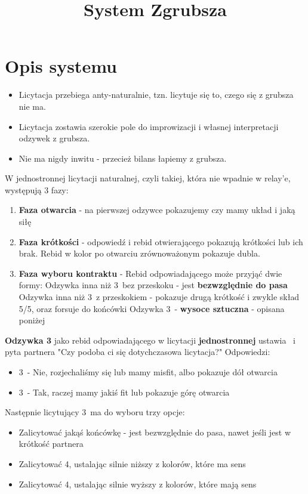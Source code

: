\documentclass[12pt, a4paper]{article}
\title{\vspace{-2cm}System Zgrubsza}
\author{}
\date{}
\begin{document}
\section{Opis systemu}
\begin{itemize}
    \item Licytacja przebiega anty-naturalnie, tzn. licytuje się to, czego się z grubsza nie ma.
    \item Licytacja zostawia szerokie pole do improwizacji i własnej interpretacji odzywek z grubsza.
    \item Nie ma nigdy inwitu - przecież bilans łapiemy z grubsza.
\end{itemize}
W jednostronnej licytacji naturalnej, czyli takiej, która nie wpadnie w relay'e, występują 3 fazy:
\begin{enumerate}[label=\textbf{\arabic*.}]
    \item \textbf{Faza otwarcia} - na pierwszej odzywce pokazujemy czy mamy układ i jaką siłę
    \item \textbf{Faza krótkości} - odpowiedź i rebid otwierającego pokazują krótkości lub ich brak.
    Rebid w kolor po otwarciu zrównoważonym pokazuje dubla.
    \item \textbf{Faza wyboru kontraktu} - Rebid odpowiadającego może przyjąć dwie formy:
    \subitem Odzywka inna niż 3\diams\ bez przeskoku - jest \textbf{bezwzględnie do pasa}
    \subitem Odzywka inna niż 3\diams\ z przeskokiem - pokazuje drugą krótkość i zwykle skład 5/5,
    oraz forsuje do końcówki
    \subitem Odzywka 3\diams\ - \textbf{wysoce sztuczna} - opisana poniżej
\end{enumerate}
\begin{formal}
    \textbf{Odzywka 3\diams} jako rebid odpowiadającego w licytacji \textbf{jednostronnej} ustawia \gf\ 
    i pyta partnera "Czy podoba ci się dotychczasowa licytacja?"
    Odpowiedzi:
    \begin{itemize}
        \item 3\hearts\ - Nie, rozjechaliśmy się lub mamy misfit, albo pokazuje dół otwarcia
        \item 3\spades\ - Tak, raczej mamy jakiś fit lub pokazuje górę otwarcia 
    \end{itemize}
    Następnie licytujący 3\diams\ ma do wyboru trzy opcje:
    \begin{itemize}
        \item Zalicytować jakąś końcówkę - jest bezwzględnie do pasa, nawet jeśli jest w krótkość partnera
        \item Zalicytować 4\clubs, ustalając silnie niższy z kolorów, które ma sens
        \item Zalicytować 4\diams, ustalając silnie wyższy z kolorów, które mają sens
    \end{itemize}
\end{formal}
\end{document}
